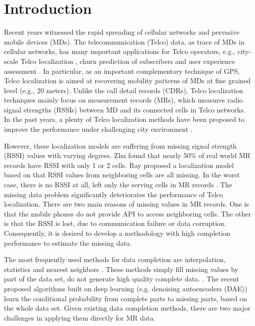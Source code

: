 \section{Introduction}
Recent years witnessed the rapid spreading of cellular networks and pervasive mobile devices (MDs). The telecommunication (Telco) data, as trace of MDs in cellular networks, has many important applications for Telco operators, e.g., city-scale Telco localization \cite{DBLP:conf/cikm/ZhuLYZZGDRZ16}, churn prediction of subscribers \cite{DBLP:conf/sigmod/HuangZYDLND0Z15} and user experience assessment \cite{DBLP:journals/tist/LuoZYDY16}. In particular, as an important complementary technique of GPS, Telco localization is aimed at recovering mobility patterns of MDs at fine grained level (e.g., 20 meters). Unlike the call detail records (CDRs), Telco localization techniques mainly focus on measurement records (MRs), which measures radio signal strengths (RSSIs) between MD and its connected cells in Telco networks. In the past years, a plenty of Telco localization methods have been proposed to improve the performance under challenging city environment \cite{DBLP:conf/icc/IbrahimY11, DBLP:conf/icc/HaraAYDZ11,DBLP:journals/tvt/IbrahimY12,DBLP:conf/infocom/RayDM16,DBLP:conf/infocom/MargoliesBBDJUV17}.

However, these localization models are suffering from missing signal strength (RSSI) values with varying degrees. Zhu \cite{DBLP:conf/cikm/ZhuLYZZGDRZ16} found that nearly 50\% of real world MR records have RSSI with only 1 or 2 cells. Ray \cite{DBLP:conf/infocom/RayDM16} proposed a localization model based on that RSSI values from neighboring cells are all missing. In the worst case, there is no RSSI at all, left only the serving cells in MR records \cite{DBLP:conf/gis/PereraBKB15}. The missing data problem significantly deteriorates the performance of Telco localization. There are two main reasons of missing values in MR records. One is that the mobile phones do not provide API to access neighboring cells. The other is that the RSSI is lost, due to communication failure or data corruption. Consequently, it is desired to develop a methodology with high completion performance to estimate the missing data.

The most frequently used methods for data completion are interpolation, statistics and nearest neighbors \cite{DBLP:journals/bioinformatics/TroyanskayaCSBHTBA01}. These methods simply fill missing values by part of the data set, do not generate high quality complete data. . The recent proposed algorithms built on deep learning (e.g. denoising autoencoders (DAE)) \cite{DBLP:conf/pakdd/GondaraW18} learn the conditional probability from complete parts to missing parts, based on the whole data set. Given existing data completion methods, there are two major challenges in applying them directly for MR data.

